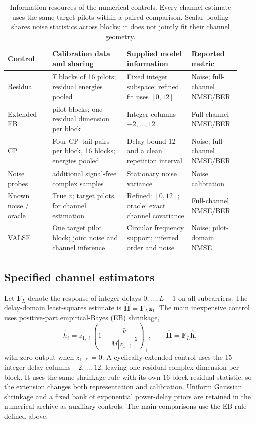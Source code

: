 \begin{table}[t]
\centering
\caption{Information resources of the numerical controls. Every channel estimate
uses the same target pilots within a paired comparison. Scalar pooling shares
noise statistics across blocks; it does not jointly fit their channel geometry.}
\label{tab:resources}
\small
\renewcommand{\arraystretch}{1.12}
\begin{tabular}{@{}>{\raggedright\arraybackslash}p{0.18\linewidth}>{\raggedright\arraybackslash}p{0.30\linewidth}>{\raggedright\arraybackslash}p{0.26\linewidth}>{\raggedright\arraybackslash}p{0.18\linewidth}@{}}
\toprule
Control & Calibration data and sharing & Supplied model information & Reported metric \\
\midrule
Residual & $T$ blocks of 16 pilots; residual energies pooled & Fixed integer
subspace; refined fit uses $[0,12]$ & Noise; full-channel NMSE/BER \\
Extended EB & 16 pilot blocks; one residual dimension per block & Integer
columns $-2,\ldots,12$ & Full-channel NMSE/BER \\
CP & Four CP--tail pairs per block, 16 blocks; energies pooled & Delay bound
12 and a clean repetition interval & Noise; full-channel NMSE/BER \\
Noise probes & 64 additional signal-free complex samples & Stationary noise
variance & Noise calibration \\
Known noise / oracle & True $v$; target pilots for channel estimation & Refined:
$[0,12]$; oracle: exact channel covariance & Full-channel NMSE/BER \\
VALSE & One target pilot block; joint noise and channel inference & Circular
frequency support; inferred order and noise & Noise; pilot-domain NMSE \\
\bottomrule
\end{tabular}
\end{table}

\subsection{Specified channel estimators}
Let $\mathbf F_L$ denote the response of integer delays $0,\ldots,L-1$ on
all subcarriers. The delay-domain least-squares estimate is
$\widehat{\mathbf H}=\mathbf F_L\mathbf z_1$. The main inexpensive control
uses positive-part empirical-Bayes (EB) shrinkage,
\begin{equation}
 \widehat h_\ell=z_{1,\ell}
 \left(1-\frac{\widehat v}{M|z_{1,\ell}|^2}\right)_+,
 \qquad \widehat{\mathbf H}=\mathbf F_L\widehat{\mathbf h},
 \label{eq:eb}
\end{equation}
with zero output when $z_{1,\ell}=0$. A cyclically extended control uses the
15 integer-delay columns $-2,\ldots,12$, leaving one residual complex
dimension per block. It uses the same shrinkage rule with its own 16-block
residual statistic, so the extension changes both representation and calibration.
Uniform Gaussian shrinkage and a fixed bank of exponential power-delay priors
are retained in the numerical archive as auxiliary controls. The main comparisons
use the EB rule defined above.

